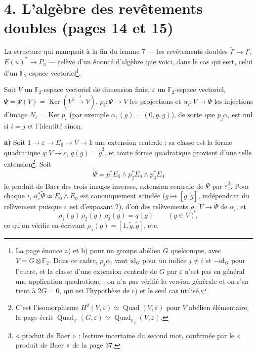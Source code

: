 \documentclass[11pt,a4paper]{article}
\begin{document}
\section*{4. L'algèbre des revêtements doubles (pages 14 et 15)}

La structure qui manquait à la fin du lemme 7 --- les revêtements doubles
$\widetilde\Gamma \to \Gamma$, $E(u)^* \to P_u$ --- relève d'un énoncé
d'algèbre que voici, dans le cas qui sert, celui d'un $\mathbb{F}_2$-espace
vectoriel\footnote{La page énonce a) et b) pour un groupe abélien $G$
quelconque, avec $V = G \otimes \mathbb{F}_2$. Dans ce cadre, $p_j \alpha_i$
vaut $\mathrm{id}_G$ pour un indice $j \neq i$ et $-\mathrm{id}_G$ pour
l'autre, et la classe d'une extension centrale de $G$ par $\varepsilon$ n'est
pas en général une application quadratique ; on n'a pas vérifié la version
générale et on s'en tient à $2G = 0$, qui est l'hypothèse de c) et le seul cas
utilisé.}.

Soit $V$ un $\mathbb{F}_2$-espace vectoriel de dimension finie, $\varepsilon$
un $\mathbb{F}_2$-espace vectoriel, $\Psi = \Psi(V) = \operatorname{Ker}(V^3
\xrightarrow{\ +\ } V)$, $p_i : \Psi \to V$ les projections et $\alpha_i : V
\to \Psi$ les injections d'image $N_i = \operatorname{Ker} p_i$ (par exemple
$\alpha_1(g) = (0, g, g)$), de sorte que $p_j \alpha_i$ est nul si $i = j$ et
l'identité sinon.

\textbf{a)} Soit $1 \to \varepsilon \to E_0 \to V \to 1$ une extension
centrale ; sa classe est la forme quadratique $q : V \to \varepsilon$, $q(g) =
\tilde g^2$, et toute forme quadratique provient d'une telle
extension\footnote{C'est l'isomorphisme $H^2(V, \varepsilon) \simeq
\operatorname{Quad}(V, \varepsilon)$ pour $V$ abélien élémentaire, la page
écrit $\operatorname{Quad}_{\mathbb{Z}}(G, \varepsilon) \simeq
\operatorname{Quad}_{\mathbb{F}_2}(V, \varepsilon)$.}. Soit
\[
\widetilde\Psi = p_1^* E_0 \wedge p_2^* E_0 \wedge p_3^* E_0
\]
le produit de Baer des trois images inverses, extension centrale de $\Psi$ par
$\varepsilon$\footnote{« produit de Baer » : lecture incertaine du second
mot, confirmée par le « produit de Baer » de la page 37.}. Pour chaque $i$,
$\alpha_i^* \widetilde\Psi \simeq E_0 \wedge E_0$ est canoniquement scindée
($g \mapsto [\tilde g, \tilde g]$, indépendant du relèvement puisque
$\varepsilon$ est d'exposant 2), d'où des relèvements $\rho_i : V \to
\widetilde\Psi$ de $\alpha_i$, et
\[
\rho_1(g)\, \rho_2(g)\, \rho_3(g) = q(g) \qquad (g \in V),
\]
ce qu'on vérifie en écrivant $\rho_1(g) = [1, \tilde g, \tilde g]$, etc.
\end{document}
